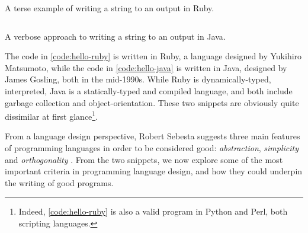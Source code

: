 \begin{listing}
  \inputminted{ruby}{./corpus/hello.rb}
  \caption{A terse example of writing a string to an output in Ruby.}
  \label{code:hello-ruby}
\end{listing}

\begin{listing}
  \inputminted{java}{./corpus/hello.java}
  \caption{A verbose approach to writing a string to an output in Java.}
  \label{code:hello-java}
\end{listing}

The code in \ref{code:hello-ruby} is written in Ruby, a language designed by Yukihiro Matsumoto, while the code in \ref{code:hello-java} is written in Java, designed by James Gosling, both in the mid-1990s. While Ruby is dynamically-typed, interpreted, Java is a statically-typed and compiled language, and both include garbage collection and object-orientation. These two snippets are obviously quite dissimilar at first glance\footnote{Indeed, \ref{code:hello-ruby} is also a valid program in Python and Perl, both scripting languages.}.

From a language design perspective, Robert Sebesta suggests three main features of programming languages in order to be considered good: \emph{abstraction}, \emph{simplicity} and \emph{orthogonality} \citep{sebesta_concepts_2018}. From the two snippets, we now explore some of the most important criteria in programming language design, and how they could underpin the writing of good programs.

